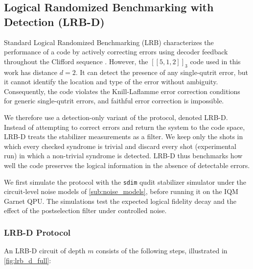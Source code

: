 \subsection{Logical Randomized Benchmarking with Detection (LRB-D)}
\label{sub:lrb_d}

Standard Logical Randomized Benchmarking (LRB) characterizes the performance of a code by actively correcting errors using decoder feedback throughout the Clifford sequence \cite{Combes2017}. However, the $[[5,1,2]]_3$ code used in this work has distance $d=2$. It can detect the presence of any single-qutrit error, but it cannot identify the location and type of the error without ambiguity. Consequently, the code violates the Knill-Laflamme error correction conditions for generic single-qutrit errors, and faithful error correction is impossible.

We therefore use a detection-only variant of the protocol, denoted LRB-D. Instead of attempting to correct errors and return the system to the code space, LRB-D treats the stabilizer measurements as a filter. We keep only the shots in which every checked syndrome is trivial and discard every shot (experimental run) in which a non-trivial syndrome is detected. LRB-D thus benchmarks how well the code preserves the logical information in the absence of detectable errors.

We first simulate the protocol with the \texttt{sdim} qudit stabilizer simulator under the circuit-level noise models of \autoref{sub:noise_models}, before running it on the IQM Garnet QPU. The simulations test the expected logical fidelity decay and the effect of the postselection filter under controlled noise.

\subsubsection{LRB-D Protocol}
An LRB-D circuit of depth $m$ consists of the following steps, illustrated in \autoref{fig:lrb_d_full}:


